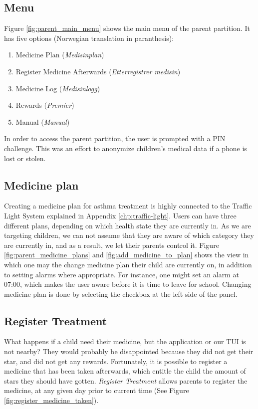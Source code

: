 \subsection{Menu}
\label{sec:description-menu}
Figure \ref{fig:parent_main_menu} shows the main menu of the parent partition. It has five options (Norwegian translation in paranthesis):
\begin{enumerate}
  \item Medicine Plan (\emph{Medisinplan})
  \item Register Medicine Afterwards (\emph{Etterregistrer medisin})
  \item Medicine Log (\emph{Medisinlogg})
  \item Rewards (\emph{Premier})
  \item Manual (\emph{Manual})
\end{enumerate} 

In order to access the parent partition, the user is prompted with a PIN challenge. This was an effort to anonymize children's medical data if a phone is lost or stolen. 

\subsection{Medicine plan}
\label{sec:description-medicine-plan}
Creating a medicine plan for asthma treatment is highly connected to the Traffic Light System explained in Appendix \ref{chp:traffic-light}.
Users can have three different plans, depending on which health state they are currently in. As we are targeting children, we can not assume that they are aware of which category they are currently in, and as a result, we let their parents control it. Figure \ref{fig:parent_medicine_plans} and \ref{fig:add_medicine_to_plan} shows the view in which one may the change medicine plan their child are currently on, in addition to setting alarms where appropriate. For instance, one might set an alarm at 07:00, which makes the user aware before it is time to leave for school. Changing medicine plan is done by selecting the checkbox at the left side of the panel.  


\subsection{Register Treatment}
\label{sec:description-register-medicine}
What happens if a child need their medicine, but the application or our TUI is not nearby? They would probably be disappointed because they did not get their star, and did not get any rewards. Fortunately, it is possible to register a medicine that has been taken afterwards, which entitle the child the amount of stars they should have gotten. \emph{Register Treatment} allows parents to register the medicine, at any given day prior to current time (See Figure \ref{fig:register_medicine_taken}).  


